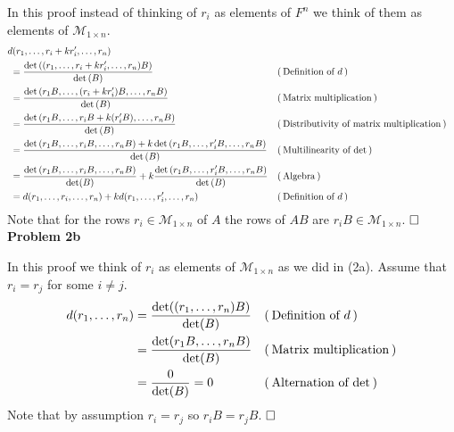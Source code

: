 \documentclass[fleqn]{article}
\newcommand{\problem}[1]{\large\textbf{Problem #1}\normalsize}
\newcommand{\evidence}[1]{\ensuremath{(\hspace{0.2em} \text{#1} \hspace{0.2em})}}
\newcommand{\qed}{\hfill\ensuremath{\square}}
\begin{document}
In this proof instead of thinking of $r_i$ as elements of $F^n$ we think of
them as elements of $\mathcal{M}_{1 \times n}$.
\begin{align*}
  & d(r_1, \dots, r_i + kr_i', \dots, r_n) \\
  {} & \hspace{0.3em} = \frac{\det{((r_1, \dots, r_i + kr_i', \dots, r_n)B)}}{\det{(B)}}
     && \evidence{Definition of $d$} \\
  {} & \hspace{0.3em} = \frac{\det{(r_1B, \dots, (r_i + kr_i')B, \dots, r_nB)}}{\det{(B)}}
     && \evidence{Matrix multiplication} \\
  {} & \hspace{0.3em} = \frac{\det{(r_1B, \dots, r_iB + k(r_i'B), \dots, r_nB)}}{\det{(B)}}
     && \evidence{Distributivity of matrix multiplication} \\
  {} & \hspace{0.3em} = \frac{\det{(r_1B, \dots, r_iB, \dots, r_nB)} +
              k \det{(r_1B, \dots, r_i'B, \dots, r_nB)}}{\det{(B)}}
     &&  \evidence{Multilinearity of $\det$} \\
  {} & \hspace{0.3em} = \frac{\det{(r_1B, \dots, r_iB, \dots, r_nB)}}{\det(B)} +
              k \frac{\det{(r_1B, \dots, r_i'B, \dots, r_nB)}}{\det{(B)}}
     && \evidence{Algebra} \\
  {} & \hspace{0.3em} = d(r_1, \dots, r_i, \dots, r_n) + k d(r_1, \dots, r_i', \dots, r_n)
     && \evidence{Definition of $d$}
\end{align*}
Note that for the rows $r_i \in \mathcal{M}_{1 \times n}$ of $A$ the
rows of $AB$ are $r_iB \in \mathcal{M}_{1 \times n}$. $\qed$ \\

\problem{2b}

In this proof we think of $r_i$ as elements of $\mathcal{M}_{1 \times n}$ as we
did in (2a). Assume that $r_i = r_j$ for some $i \neq j$.
\begin{align*}
  d(r_1, \dots, r_n)
     &= \frac{\det((r_1, \dots, r_n)B)}{\det(B)}
     && \evidence{Definition of $d$} \\
  {} &= \frac{\det(r_1B, \dots, r_nB)}{\det(B)}
     && \evidence{Matrix multiplication} \\
  {} &= \frac{0}{\det(B)} = 0
     && \evidence{Alternation of $\det$}
\end{align*}
Note that by assumption $r_i = r_j$ so $r_iB = r_jB$. $\qed$ \\
\end{document}

